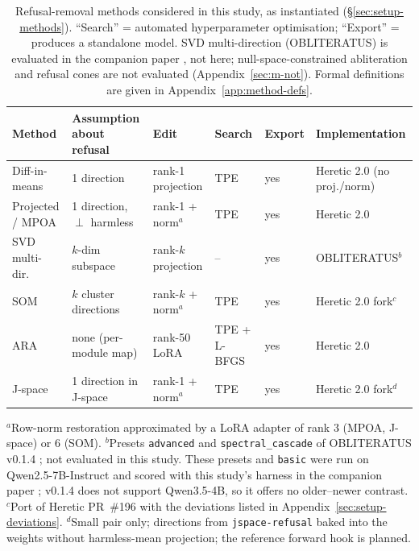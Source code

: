 \begin{table}[t]
\centering\small
\caption{Refusal-removal methods considered in this study, as instantiated
(\S\ref{sec:setup-methods}). ``Search'' = automated hyperparameter
optimisation; ``Export'' = produces a standalone model. SVD multi-direction
(OBLITERATUS) is evaluated in the companion paper \cite{young2026paper30}, not
here; null-space-constrained
abliteration and refusal cones are not evaluated (Appendix~\ref{sec:m-not}).
Formal definitions are given in Appendix~\ref{app:method-defs}.}
\label{tab:methods}
\setlength{\tabcolsep}{4pt}%
\begin{tabular}{@{}llllll@{}}
\toprule
Method & Assumption about refusal & Edit & Search & Export & Implementation \\
\midrule
Diff-in-means \cite{arditi2024refusal} & 1 direction & rank-1 projection & TPE & yes & Heretic 2.0 (no proj./norm) \\
Projected / MPOA \cite{lai2024projected,lai2025mpoa} & 1 direction, $\perp$ harmless & rank-1 + norm$^{a}$ & TPE & yes & Heretic 2.0 \\
SVD multi-dir.\ \cite{gabliteration2024} & $k$-dim subspace & rank-$k$ projection & -- & yes & OBLITERATUS$^{b}$ \\
SOM \cite{piras2025som} & $k$ cluster directions & rank-$k$ + norm$^{a}$ & TPE & yes & Heretic 2.0 fork$^{c}$ \\
ARA \cite{weidmann2026ara} & none (per-module map) & rank-50 LoRA & TPE + L-BFGS & yes & Heretic 2.0 \\
J-space & 1 direction in J-space & rank-1 + norm$^{a}$ & TPE & yes & Heretic 2.0 fork$^{d}$ \\
\bottomrule
\end{tabular}

\smallskip
\footnotesize $^{a}$Row-norm restoration approximated by a LoRA adapter of rank 3
(MPOA, J-space) or 6 (SOM).
$^{b}$Presets \texttt{advanced} and \texttt{spectral\_cascade} of OBLITERATUS
v0.1.4 \cite{obliteratus2026}; not evaluated in this study. These presets and
\texttt{basic} were run on Qwen2.5-7B-Instruct and scored with this study's
harness in the companion paper \cite{young2026paper30}; v0.1.4 does not
support Qwen3.5-4B, so it offers no older--newer contrast.
$^{c}$Port of Heretic PR~\#196 with the deviations listed in
Appendix~\ref{sec:setup-deviations}.
$^{d}$Small pair only; directions from \texttt{jspace-refusal} baked into the
weights without harmless-mean projection; the reference forward hook is planned.
\end{table}
